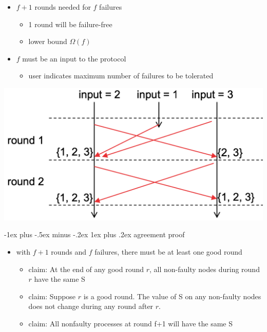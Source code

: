 \documentclass[10pt, landscape]{article}
\makeatletter
\renewcommand{\subsubsection}{\@startsection{subsubsection}{3}{0mm}%
  {-1ex plus -.5ex minus -.2ex}%
  {1ex plus .2ex}%
{\normalfont\small\bfseries}}%
\makeatother
\begin{document}
\begin{multicols*}{3}
  \begin{minipage}[c]{0.52\linewidth}\color{black}
    \begin{itemize}
      \item $f+1$ rounds needed for $f$ failures
        \begin{itemize}
          \item 1 round will be failure-free
          \item lower bound $\Omega(f)$
        \end{itemize}
      \item $f$ must be an input to the protocol
        \begin{itemize}
          \item user indicates maximum number of failures to be tolerated
        \end{itemize}
    \end{itemize}
  \end{minipage}
  \begin{minipage}[c]{0.45\linewidth}
    \includegraphics[width=\linewidth]{cs4231-distributedconsensus-v1.png} 
  \end{minipage}

  \subsubsection{agreement proof}

  \begin{itemize}
    \item with $f+1$ rounds and $f$ failures, there must be at least one good round
      \begin{itemize}
        \item claim: At the end of any good round $r$, all non-faulty nodes during round $r$ have the same S
        \item claim: Suppose $r$ is a good round. The value of S on any non-faulty nodes does not change during any round after $r$.
        \item claim: All nonfaulty processes at round f+1 will have the same S
      \end{itemize}
  \end{itemize}


\end{multicols*}
\end{document}
